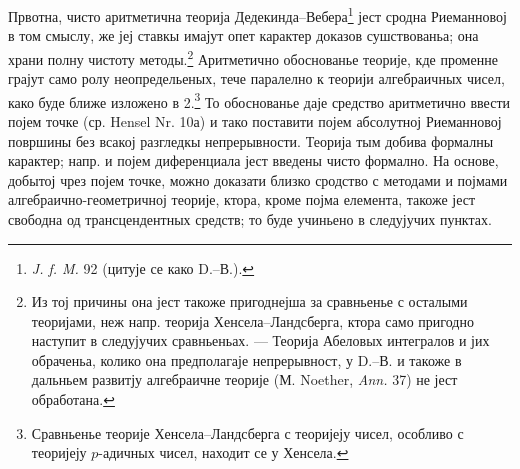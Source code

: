 ﻿\documentclass[11pt]{article}
\begin{document}
Првотна, чисто аритметична теорија Дедекинда--Вебера\footnote{\emph{J. f. M.} 92 (цитује се како D.--В.).} јест сродна Риеманновој в том смыслу, же јеј ставкы имајут опет карактер доказов сушствованьа; она храни полну чистоту методы.\footnote{Из тој причины она јест такоже пригоднејша за сравньенье с осталыми теоријами, неж напр. теорија Хенсела--Ландсберга, ктора само пригодно наступит в следујучих сравньеньах. --- Теорија Абеловых интегралов и јих обраченьа, колико она предполагаје непрерывност, у D.--В. и такоже в дальньем развитју алгебраичне теорије (М. Noether, \emph{Ann.} 37) не јест обработана.} Аритметично обоснованье теорије, кде променне грајут само ролу неопредельеных, тече паралелно к теорији алгебраичных чисел, како буде ближе изложено в 2.\footnote{Сравньенье теорије Хенсела--Ландсберга с теоријеју чисел, особливо с теоријеју \(p\)-адичных чисел, находит се у Хенсела.} То обоснованье даје средство аритметично ввести појем точке (ср. Hensel Nr. 10а) и тако поставити појем абсолутној Риеманновој површины без всакој разгледкы непрерывности. Теорија тым добива формалны карактер; напр. и појем диференциала јест введены чисто формално. На основе, добытој чрез појем точке, можно доказати близко сродство с методами и појмами алгебраично-геометричној теорије, ктора, кроме појма елемента, такоже јест свободна од трансцендентных средств; то буде учиньено в следујучих пунктах.
\end{document}
